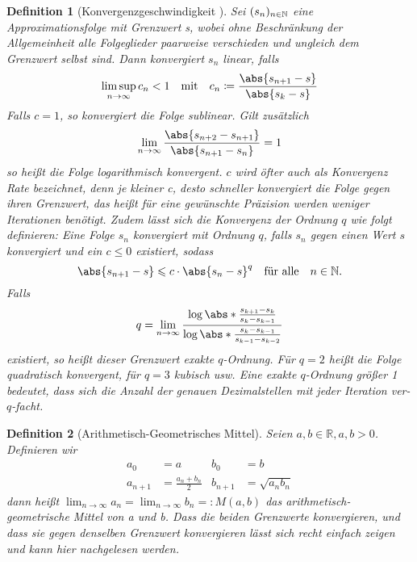 \documentclass{scrartcl}
\newtheorem{definition}{Definition}
\theoremstyle{definition}
\newtheorem{approximation sequence}{Annäherungsfolge}
\DeclarePairedDelimiter{\paren}{\lparen}{\rparen}
\newcommand{\field}[1]{\mathbb{#1}}
\newcommand{\nats}{\field{N}}
\newcommand{\reals}{\field{R}}
\begin{document}
\begin{definition}[Konvergenzgeschwindigkeit \cite{Konvergenzgeschwindigkeit}]
    \label{def:convergence-rate}
    Sei \(\paren{s_n}_{n \in \nats}\) eine Approximationsfolge mit Grenzwert s,
    wobei ohne Beschränkung der Allgemeinheit alle Folgeglieder paarweise
    verschieden und ungleich dem Grenzwert selbst sind. Dann konvergiert \(s_n\)
    linear, falls
    \begin{equation*}
        \limsup_{n \to \infty} c_n < 1 \quad \text{mit} \quad c_n
        \coloneq \frac{\abs{s_{n+1} - s}}{\abs{s_k - s}}
    \end{equation*}
    Falls \(c = 1\), so konvergiert die Folge sublinear. Gilt zusätzlich
    \begin{equation*}
        \lim_{n \to \infty} \frac{\abs{s_{n+2} - s_{n+1}}}{\abs{s_{n+1} - s_n}}
        = 1
    \end{equation*}
    so heißt die Folge logarithmisch konvergent. \(c\) wird öfter auch als
    Konvergenz Rate bezeichnet, denn je kleiner c, desto schneller konvergiert
    die Folge gegen ihren Grenzwert, das heißt für eine gewünschte Präzision
    werden weniger Iterationen benötigt. Zudem lässt sich die Konvergenz der
    Ordnung \(q\) wie folgt definieren: Eine Folge \(s_n\) konvergiert mit
    Ordnung \(q\), falls \(s_n\) gegen einen Wert \(s\) konvergiert und ein
    \(c \le 0\) existiert, sodass
    \begin{equation*}
        \abs{s_{n+1} - s} \leqslant c \cdot \abs{s_n - s}^q \quad
        \text{für alle} \quad n \in \nats.
    \end{equation*}
    Falls
    \begin{equation*}
        q = \lim_{n \to \infty} \frac{%
            \log\abs*{\frac{s_{k+1} - s_k}{s_k - s_{k-1}}}
        }{%
            \log\abs*{\frac{s_k - s_{k-1}}{s_{k-1} - s_{k-2}}}
        }
    \end{equation*}
    existiert, so heißt dieser Grenzwert exakte \(q\)-Ordnung. Für \(q = 2\)
    heißt die Folge quadratisch konvergent, für \(q = 3 \) kubisch usw.
    Eine exakte \(q\)-Ordnung größer 1 bedeutet, dass sich die Anzahl der genauen
    Dezimalstellen mit jeder Iteration ver-\(q\)-facht.
\end{definition}

\begin{definition}[Arithmetisch-Geometrisches Mittel]
    Seien \(a, b \in \reals, a,b > 0\). Definieren wir
    \begin{align*}
        a_0     & = a                   & b_0     & = b              \\
        a_{n+1} & = \frac{a_n + b_n}{2} & b_{n+1} & = \sqrt{a_n b_n}
    \end{align*}
    dann heißt \(\lim_{n \to \infty} a_n = \lim_{n \to \infty} b_n =: M(a,b)\)
    das arithmetisch-geometrische Mittel von a und b. Dass die beiden
    Grenzwerte konvergieren, und dass sie gegen denselben Grenzwert
    konvergieren lässt sich recht einfach zeigen und kann hier \cite{AGM}
    nachgelesen werden.
\end{definition}
\end{document}
